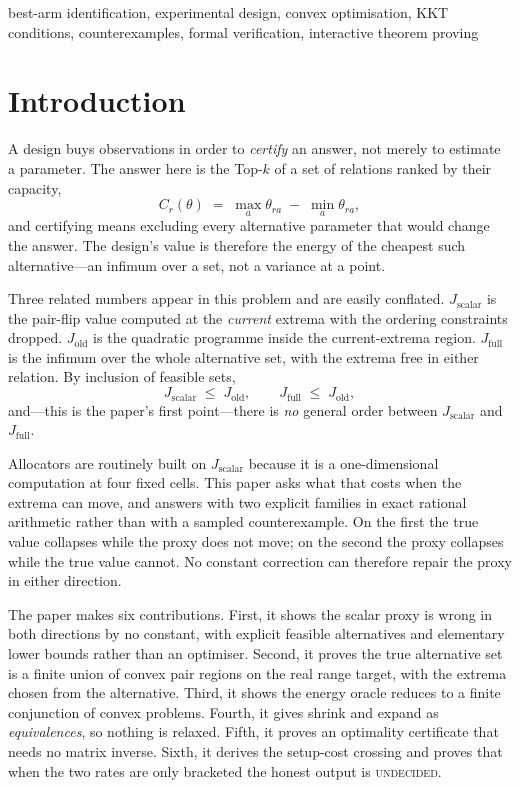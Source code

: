 \documentclass[conference]{IEEEtran}
\theoremstyle{definition}
\begin{document}
\begin{IEEEkeywords}
best-arm identification, experimental design, convex optimisation, KKT conditions,
counterexamples, formal verification, interactive theorem proving
\end{IEEEkeywords}

\section{Introduction}

A design buys observations in order to \emph{certify} an answer, not merely to estimate a
parameter. The answer here is the Top-$k$ of a set of relations ranked by their capacity,
\begin{equation}
C_{r}(\theta)\;=\;\max_{a}\theta_{ra}\;-\;\min_{a}\theta_{ra},
\label{eq:capacity}
\end{equation}
and certifying means excluding every alternative parameter that would change the answer. The
design's value is therefore the energy of the cheapest such alternative---an infimum over a
set, not a variance at a point.

Three related numbers appear in this problem and are easily conflated.
$J_{\mathrm{scalar}}$ is the pair-flip value computed at the \emph{current} extrema with the
ordering constraints dropped. $J_{\mathrm{old}}$ is the quadratic programme inside the
current-extrema region. $J_{\mathrm{full}}$ is the infimum over the whole alternative set,
with the extrema free in either relation. By inclusion of feasible sets,
\begin{equation}
J_{\mathrm{scalar}}\;\leq\;J_{\mathrm{old}},
\qquad
J_{\mathrm{full}}\;\leq\;J_{\mathrm{old}},
\label{eq:order}
\end{equation}
and---this is the paper's first point---there is \emph{no} general order between
$J_{\mathrm{scalar}}$ and $J_{\mathrm{full}}$.

Allocators are routinely built on $J_{\mathrm{scalar}}$ because it is a one-dimensional
computation at four fixed cells. This paper asks what that costs when the extrema can move,
and answers with two explicit families in exact rational arithmetic rather than with a
sampled counterexample. On the first the true value collapses while the proxy does not move;
on the second the proxy collapses while the true value cannot. No constant correction can
therefore repair the proxy in either direction.

The paper makes six contributions. First, it shows the scalar proxy is wrong in both
directions by no constant, with explicit feasible alternatives and elementary lower bounds
rather than an optimiser. Second, it proves the true alternative set is a finite union of
convex pair regions on the real range target, with the extrema chosen from the alternative.
Third, it shows the energy oracle reduces to a finite conjunction of convex problems. Fourth,
it gives shrink and expand as \emph{equivalences}, so nothing is relaxed. Fifth, it proves an
optimality certificate that needs no matrix inverse. Sixth, it derives the setup-cost
crossing and proves that when the two rates are only bracketed the honest output is
\textsc{undecided}.
\end{document}
